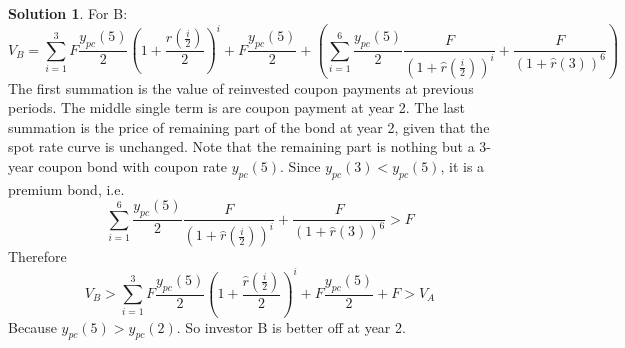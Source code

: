 \documentclass[a4paper, 10pt]{article}
\theoremstyle{definition}
\theoremstyle{hSol}
\newtheorem*{solution}{Solution}
\begin{document}
\begin{solution}
For B:
\begin{equation}
  V_B = \sum_{i=1}^{3} F\frac{y_{pc}(5)}{2}\left(1+\frac{\hat{r}(\frac{i}{2})}{2}\right)^{i} + F\frac{y_{pc}(5)}{2} + \left(\sum_{i=1}^{6}\frac{y_{pc}(5)}{2}\frac{F}{(1+\hat{r}(\frac{i}{2}))^i}+\frac{F}{(1+\hat{r}(3))^6}\right)
\end{equation}
The first summation is the value of reinvested coupon payments at previous periods. The middle single term is are coupon payment at year 2. The last summation is the price of remaining part of the bond at year 2, given that the spot rate curve is unchanged. Note that the remaining part is nothing but a 3-year coupon bond with coupon rate $y_{pc}(5)$. Since $y_{pc}(3)<y_{pc}(5)$, it is a premium bond, i.e.
$$
\sum_{i=1}^{6}\frac{y_{pc}(5)}{2}\frac{F}{(1+\hat{r}(\frac{i}{2}))^i}+\frac{F}{(1+\hat{r}(3))^6} > F
$$
Therefore
$$
V_B > \sum_{i=1}^{3} F\frac{y_{pc}(5)}{2}\left(1+\frac{\hat{r}(\frac{i}{2})}{2}\right)^{i} + F\frac{y_{pc}(5)}{2} + F > V_A
$$
Because $y_{pc}(5)>y_{pc}(2)$. So investor B is better off at year 2.
\end{solution}
\end{document}
